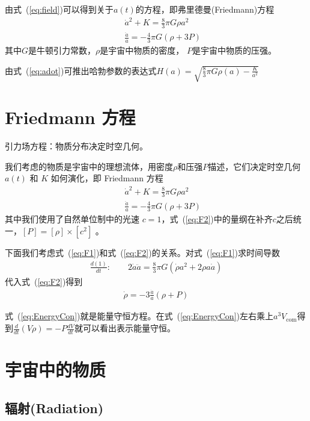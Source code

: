 \documentclass[]{ctexart}
\newcommand{\refeq}[1]{式~(\ref{#1})}
\begin{document}
由\refeq{eq:field}可以得到关于$a(t)$的方程，即弗里德曼(Friedmann)方程
\begin{eqnarray}
    &&\dot{a}^2+K = \frac{8}{3} \pi G \rho a^2 \label{eq:adot} \\
    &&\frac{\ddot{a}}{a} = -\frac{4}{3} \pi G (\rho + 3P)
\end{eqnarray}
其中$G$是牛顿引力常数，$\rho$是宇宙中物质的密度， $P$是宇宙中物质的压强。 

由\refeq{eq:adot}可推出哈勃参数的表达式$H(a)=\sqrt{\frac{8}{3}\pi G \rho(a)-\frac{K}{a^2}}$

\section{ Friedmann 方程}

引力场方程：物质分布决定时空几何。

我们考虑的物质是宇宙中的理想流体，用密度$\rho$和压强$P$描述，它们决定时空几何 $a(t)$ 和 $K$ 如何演化，即 Friedmann 方程
\begin{eqnarray}
    &&\dot{a}^2+K = \frac{8}{3} \pi G \rho a^2 \label{eq:F1}\\
    &&\frac{\ddot{a}}{a} = -\frac{4}{3} \pi G (\rho + 3P) \label{eq:F2}
\end{eqnarray}
其中我们使用了自然单位制中的光速 $c=1$，\refeq{eq:F2}中的量纲在补齐$c$之后统一，$[P]=[\rho] \times [c^2]$ 。

下面我们考虑\refeq{eq:F1}和\refeq{eq:F2}的关系。对\refeq{eq:F1}求时间导数
\begin{eqnarray}
    \frac{d(1)}{dt} : \qquad 2\dot{a}\ddot{a} = \frac{8}{3} \pi G (\dot{\rho} a^2 + 2\rho a \dot{a})
\end{eqnarray}
代入\refeq{eq:F2}得到
\begin{eqnarray}
    \dot{\rho} = -3\frac{\dot{a}}{a}(\rho+P) \label{eq:EnergyCon}
\end{eqnarray}

\refeq{eq:EnergyCon}就是能量守恒方程。在\refeq{eq:EnergyCon}左右乘上$a^3 V_\text{com}$得到$\frac{d}{dt}(V\rho) = -P\frac{dV}{dt}$就可以看出表示能量守恒。

\section{宇宙中的物质}

\subsection{辐射(Radiation)}
\end{document}
